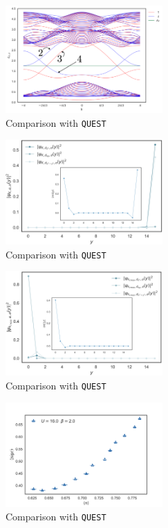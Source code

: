 \begin{figure}[H]
  \centering
  \includegraphics[width=6cm]{images/bands154.png}
  \caption{Comparison with \texttt{QUEST}}
  \label{fig:blade_flow_pressure}
\end{figure}

\begin{figure}[H]
  \centering
  \includegraphics[width=6cm]{images/bottomEdgeMagProfU154.png}
  \caption{Comparison with \texttt{QUEST}}
  \label{fig:blade_flow_pressure}
\end{figure}

\begin{figure}[H]
  \centering
  \includegraphics[width=6cm]{images/topEdgeMagProfU13.png}
  \caption{Comparison with \texttt{QUEST}}
  \label{fig:blade_flow_pressure}
\end{figure}

\begin{figure}[H]
  \centering
  \includegraphics[width=6cm]{images/signTMDdensSignU16beta2.png}
  \caption{Comparison with \texttt{QUEST}}
  \label{fig:blade_flow_pressure}
\end{figure}


